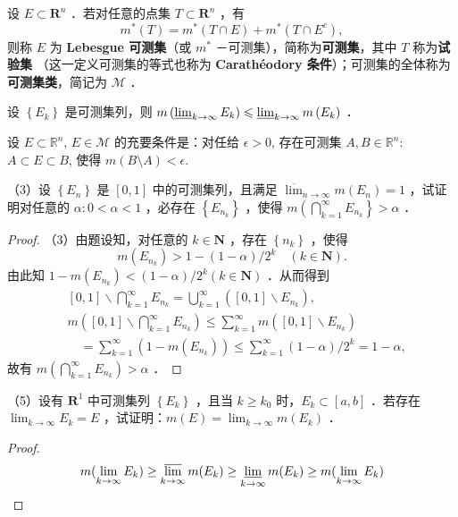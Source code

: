 \begin{definition}
设 $E \subset \mathbf{R}^n$ ．若对任意的点集 $T \subset \mathbf{R}^n$ ，有
\[
m^*(T)=m^*(T \cap E)+m^*\left(T \cap E^{c}\right),
\]则称 $E$ 为 \textbf{Lebesgue 可测集}（或 $m^*$ －可测集），简称为\textbf{可测集}，其中 $T$ 称为\textbf{试验集} （这一定义可测集的等式也称为 \textbf{Carathéodory 条件}）；可测集的全体称为\textbf{可测集类}，简记为 $\mathcal{M}$ ．
\end{definition}
\begin{proposition}
设 $\left\{E_k\right\}$ 是可测集列，则 $m\left(\varliminf _{k \rightarrow \infty} E_k\right) \leqslant \varliminf_{k \rightarrow \infty} m\left(E_k\right)$ ．
\end{proposition}
\begin{exercise}
设 $E\subset \mathbb{R}^{n}$, $E\in \mathcal{M}$ 的充要条件是：对任给 $\epsilon>0$, 存在可测集 $A, B\in \mathbb{R}^{n}$: $A\subset E\subset B$, 使得 $m(B\setminus A)<\epsilon$.
\end{exercise}
\begin{exercise}
（3）设 $\left\{E_n\right\}$ 是 $[0,1]$ 中的可测集列，且满足 $\overline{\lim }_{n \rightarrow \infty} m\left(E_n\right)=1$ ，试证明对任意的 $\alpha: 0<\alpha<1$ ，必存在 $\left\{E_{n_k}\right\}$ ，使得 $m\left(\bigcap_{k=1}^{\infty} E_{n_k}\right\}>\alpha$ ．
\end{exercise}
\begin{proof}
（3）由题设知，对任意的 $k \in \mathbf{N}$ ，存在 $\left\{n_k\right\}$ ，使得
\[
m\left(E_{n_k}\right)>1-(1-\alpha) / 2^k \quad(k \in \mathbf{N}) .
\]
由此知 $1-m\left(E_{n_k}\right)<(1-\alpha) / 2^k(k \in \mathbf{N})$ ．从而得到
\[
\begin{aligned}
& {[0,1] \backslash \bigcap_{k=1}^{\infty} E_{n_k}=\bigcup_{k=1}^{\infty}\left([0,1] \backslash E_{n_k}\right),} \\
& m\left([0,1] \backslash \bigcap_{k=1}^{\infty} E_{n_k}\right) \leqslant \sum_{k=1}^{\infty} m\left([0,1] \backslash E_{n_k}\right) \\
& \quad=\sum_{k=1}^{\infty}\left(1-m\left(E_{n_k}\right)\right) \leqslant \sum_{k=1}^{\infty}(1-\alpha) / 2^k=1-\alpha,
\end{aligned}
\]
故有 $m\left(\bigcap_{k=1}^{\infty} E_{n_k}\right)>\alpha$ ．
\end{proof}

\begin{exercise}
（5）设有 $\mathbf{R}^1$ 中可测集列 $\left\{E_k\right\}$ ，且当 $k \geqslant k_0$ 时，$E_k \subset[a, b]$ ．若存在 $\lim _{k \rightarrow \infty} E_k=E$ ，试证明：$m(E)=\lim _{k \rightarrow \infty} m\left(E_k\right)$ ．
\end{exercise}
\begin{proof}
\[
m(\lim_{ k \to \infty } E_k)\geq \varlimsup_{ k \to \infty } m(E_k)\geq \varliminf_{ k \to \infty } m(E_k)\geq m(\lim_{ k \to \infty } E_k)
\]
\end{proof}

